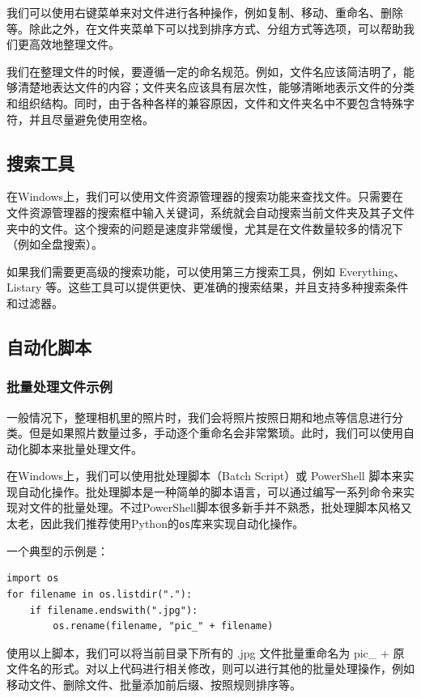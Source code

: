 \documentclass[../main.tex]{subfiles}
\begin{document}
我们可以使用右键菜单来对文件进行各种操作，例如复制、移动、重命名、删除等。除此之外，在文件夹菜单下可以找到排序方式、分组方式等选项，可以帮助我们更高效地整理文件。

我们在整理文件的时候，要遵循一定的命名规范。例如，文件名应该简洁明了，能够清楚地表达文件的内容；文件夹名应该具有层次性，能够清晰地表示文件的分类和组织结构。同时，由于各种各样的兼容原因，文件和文件夹名中不要包含特殊字符，并且尽量避免使用空格。

\subsection{搜索工具}

在Windows上，我们可以使用文件资源管理器的搜索功能来查找文件。只需要在文件资源管理器的搜索框中输入关键词，系统就会自动搜索当前文件夹及其子文件夹中的文件。这个搜索的问题是速度非常缓慢，尤其是在文件数量较多的情况下（例如全盘搜索）。

如果我们需要更高级的搜索功能，可以使用第三方搜索工具，例如 Everything、Listary 等。这些工具可以提供更快、更准确的搜索结果，并且支持多种搜索条件和过滤器。

\subsection{自动化脚本}

\subsubsection{批量处理文件示例}

一般情况下，整理相机里的照片时，我们会将照片按照日期和地点等信息进行分类。但是如果照片数量过多，手动逐个重命名会非常繁琐。此时，我们可以使用自动化脚本来批量处理文件。

在Windows上，我们可以使用批处理脚本（Batch Script）或 PowerShell 脚本来实现自动化操作。批处理脚本是一种简单的脚本语言，可以通过编写一系列命令来实现对文件的批量处理。不过PowerShell脚本很多新手并不熟悉，批处理脚本风格又太老，因此我们推荐使用Python的\texttt{os}库来实现自动化操作。

一个典型的示例是：

\begin{verbatim}
import os
for filename in os.listdir("."):  
    if filename.endswith(".jpg"):  
        os.rename(filename, "pic_" + filename)  
\end{verbatim}

使用以上脚本，我们可以将当前目录下所有的 .jpg 文件批量重命名为 pic\_ + 原文件名的形式。对以上代码进行相关修改，则可以进行其他的批量处理操作，例如移动文件、删除文件、批量添加前后缀、按照规则排序等。
\end{document}

